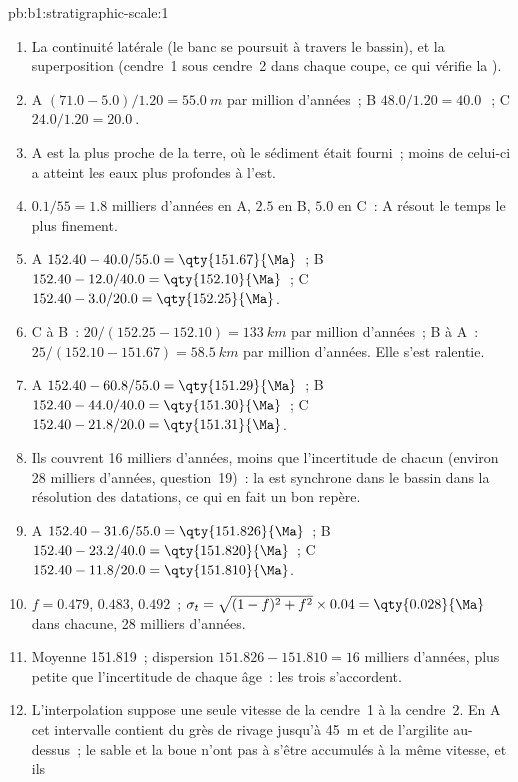 \begin{solution}{pb:b1:stratigraphic-scale:1}
\begin{enumerate}
  \item La continuité latérale (le banc se poursuit à travers le bassin), et
        la superposition (cendre~1 sous cendre~2 dans chaque coupe, ce qui vérifie la
        ).
  \item A $(71.0 - 5.0)/1.20 = \qty{55.0}{m}$ par million d'années~; B
        $48.0/1.20 = \qty{40.0}{}$~; C $24.0/1.20 = \qty{20.0}{}$.
  \item A est la plus proche de la terre, où le sédiment était fourni~; moins de celui-ci
        a atteint les eaux plus profondes à l'est.
  \item $0.1/55 = \num{1.8}$ milliers d'années en A, $\num{2.5}$ en B, $\num{5.0}$
        en C~: A résout le temps le plus finement.
  \item A $152.40 - 40.0/55.0 = \qty{151.67}{\Ma}$~; B $152.40 - 12.0/40.0 =
        \qty{152.10}{\Ma}$~; C $152.40 - 3.0/20.0 = \qty{152.25}{\Ma}$.
  \item C à B~: $20/(152.25 - 152.10) = \qty{133}{km}$ par million d'années~; B à A~:
        $25/(152.10 - 151.67) = \qty{58.5}{km}$ par million d'années. Elle s'est
        ralentie.
  \item A $152.40 - 60.8/55.0 = \qty{151.29}{\Ma}$~; B $152.40 - 44.0/40.0 =
        \qty{151.30}{\Ma}$~; C $152.40 - 21.8/20.0 = \qty{151.31}{\Ma}$.
  \item Ils couvrent \num{16} milliers d'années, moins que l'incertitude de chacun
        (environ \num{28} milliers d'années, question~19)~: la  est
        synchrone dans le bassin dans la résolution des datations, ce qui
        en fait un bon repère.
  \item A $152.40 - 31.6/55.0 = \qty{151.826}{\Ma}$~; B $152.40 - 23.2/40.0 =
        \qty{151.820}{\Ma}$~; C $152.40 - 11.8/20.0 = \qty{151.810}{\Ma}$.
  \item $f = 0.479$, $0.483$, $0.492$~; $\sigma_t = \sqrt{(1 - f)^2 + f^2} \times
        0.04 = \qty{0.028}{\Ma}$ dans chacune, \num{28} milliers d'années.
  \item Moyenne \qty{151.819}{\Ma}~; dispersion $151.826 - 151.810 = \num{16}$ milliers
        d'années, plus petite que l'incertitude de chaque âge~: les trois s'accordent.
  \item L'interpolation suppose une seule vitesse de la cendre~1 à la cendre~2. En A cet
        intervalle contient du grès de rivage jusqu'à \qty{45}{m} et de l'argilite au-dessus~;
        le sable et la boue n'ont pas à s'être accumulés à la même vitesse, et ils

\end{enumerate}
\end{solution}
